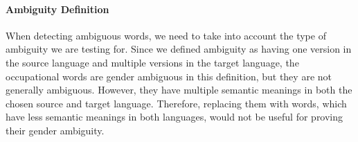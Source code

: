 \paragraph{Ambiguity Definition}
When detecting ambiguous words, we need to take into account the type of ambiguity we are testing for. Since we defined ambiguity as having one version in the source language and multiple versions in the target language, the occupational words are gender ambiguous in this definition, but they are not generally ambiguous. However, they have multiple semantic meanings in both the chosen source and target language. Therefore, replacing them with words, which have less semantic meanings in both languages, would not be useful for proving their gender ambiguity.

